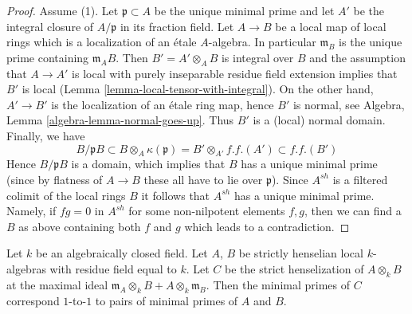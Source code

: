 \begin{proof}
\medskip\noindent
Assume (1). Let $\mathfrak p \subset A$ be the unique minimal
prime and let $A'$ be the integral closure of $A/\mathfrak p$
in its fraction field. Let $A \to B$ be a local map of local rings which is a
localization of an \'etale $A$-algebra. In particular $\mathfrak m_B$
is the unique prime containing $\mathfrak m_AB$. Then $B' = A' \otimes_A B$
is integral over $B$ and the assumption that $A \to A'$ is local
with purely inseparable residue field extension implies that $B'$
is local (Lemma \ref{lemma-local-tensor-with-integral}).
On the other hand, $A' \to B'$ is the localization
of an \'etale ring map, hence $B'$ is normal, see
Algebra, Lemma \ref{algebra-lemma-normal-goes-up}.
Thus $B'$ is a (local) normal domain. Finally, we have
$$
B/\mathfrak pB \subset B \otimes_A \kappa(\mathfrak p)
= B' \otimes_{A'} f.f.(A') \subset f.f.(B')
$$
Hence $B/\mathfrak pB$ is a domain, which implies that $B$ has a unique
minimal prime (since by flatness of $A \to B$ these all have to lie
over $\mathfrak p$). Since $A^{sh}$ is a filtered colimit of
the local rings $B$ it follows that $A^{sh}$ has a unique minimal prime.
Namely, if $fg = 0$ in $A^{sh}$ for some non-nilpotent elements
$f, g$, then we can find a $B$ as above containing both $f$ and $g$
which leads to a contradiction.
\end{proof}

\begin{lemma}
\label{lemma-minimal-primes-tensor-strictly-henselian}
Let $k$ be an algebraically closed field. Let $A$, $B$ be strictly
henselian local $k$-algebras with residue field equal to $k$.
Let $C$ be the strict henselization of $A \otimes_k B$ at the maximal
ideal $\mathfrak m_A \otimes_k B + A \otimes_k \mathfrak m_B$.
Then the minimal primes of $C$ correspond $1$-to-$1$ to pairs of
minimal primes of $A$ and $B$.
\end{lemma}

